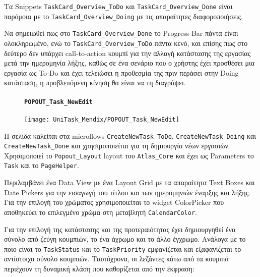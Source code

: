                 Τα Snippets \texttt{TaskCard\_Overview\_ToDo} και \texttt{TaskCard\_Overview\_Done} είναι παρόμοια με το \texttt{TaskCard\_Overview\_Doing} με τις απαραίτητες διαφοροποιήσεις.

                Να σημειωθεί πως στο \texttt{TaskCard\_Overview\_Done} το Progress Bar πάντα είναι ολοκληρωμένο, ενώ το \texttt{TaskCard\_Overview\_ToDo} πάντα κενό, και επίσης πως στο δεύτερο δεν υπάρχει call-to-action κουμπί για την αλλαγή κατάστασης της εργασίας μετά την ημερομηνία λήξης, καθώς σε ένα σενάριο που ο χρήστης έχει προσθέσει μια εργασία ως To-Do και έχει τελειώσει η προθεσμία της πριν περάσει στην Doing κατάσταση, η προβλεπόμενη κίνηση θα είναι να τη διαγράψει.

                \newpage


                \begin{figure}[H] \noindent
                    \paragraph{\texttt{POPOUT\_Task\_NewEdit}}
                    \begin{center}
                        \texttt{[image: UniTask\_Mendix/POPOUT\_Task\_NewEdit]}
                    \end{center}
                \end{figure}

                Η σελίδα καλείται στα microflows \texttt{CreateNewTask\_ToDo}, \texttt{CreateNewTask\_Doing} και \texttt{CreateNewTask\_Done} και χρησιμοποιείται για τη δημιουργία νέων εργασιών. Χρησιμοποιεί το \texttt{Popout\_Layout} layout του \texttt{Atlas\_Core} και έχει ως Parameters το \texttt{Task} και το \texttt{PageHelper}.

                Περιλαμβάνει ένα Data View με ένα Layout Grid με τα απαραίτητα Text Boxes και Date Pickers για την εισαγωγή του τίτλου και των ημερομηνιών έναρξης και λήξης. Για την επιλογή του χρώματος χρησιμοποιείται το widget ColorPicker που αποθηκεύει το επιλεγμένο χρώμα στη μεταβλητή \texttt{CalendarColor}.

                Για την επιλογή της κατάστασης και της προτεραιότητας έχει δημιουργηθεί ένα σύνολο από ζεύγη κουμπιών, το ένα άχρωμο και το άλλο έγχρωμο. Ανάλογα με το ποιο είναι το \texttt{TaskStatus} και το \texttt{TaskPriority} εμφανίζεται και εξαφανίζεται το αντίστοιχο σύνολο κουμπιών. Ταυτόχρονα, οι λεζάντες κάτω από τα κουμπιά περιέχουν τη δυναμική κλάση που καθορίζεται από την έκφραση:

